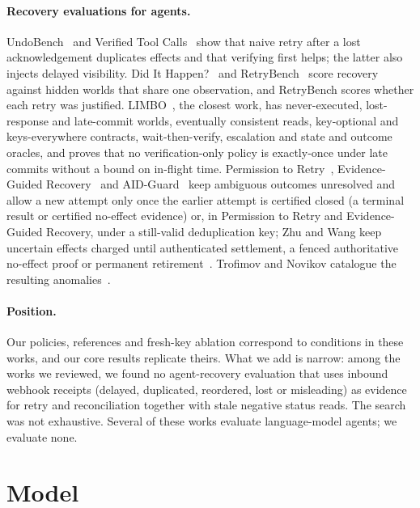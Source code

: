 \documentclass[11pt]{article}
\begin{document}
\paragraph{Recovery evaluations for agents.} UndoBench~\cite{undobench} and Verified Tool Calls~\cite{verified} show that naive retry after a lost acknowledgement duplicates effects and that verifying first helps; the latter also injects delayed visibility. Did It Happen?~\cite{didithappen} and RetryBench~\cite{retrybench} score recovery against hidden worlds that share one observation, and RetryBench scores whether each retry was justified. LIMBO~\cite{limbo}, the closest work, has never-executed, lost-response and late-commit worlds, eventually consistent reads, key-optional and keys-everywhere contracts, wait-then-verify, escalation and state and outcome oracles, and proves that no verification-only policy is exactly-once under late commits without a bound on in-flight time. Permission to Retry~\cite{permission}, Evidence-Guided Recovery~\cite{evidence} and AID-Guard~\cite{aidguard} keep ambiguous outcomes unresolved and allow a new attempt only once the earlier attempt is certified closed (a terminal result or certified no-effect evidence) or, in Permission to Retry and Evidence-Guided Recovery, under a still-valid deduplication key; Zhu and Wang keep uncertain effects charged until authenticated settlement, a fenced authoritative no-effect proof or permanent retirement~\cite{budget}. Trofimov and Novikov catalogue the resulting anomalies~\cite{trofimov}.

\paragraph{Position.} Our policies, references and fresh-key ablation correspond to conditions in these works, and our core results replicate theirs. What we add is narrow: among the works we reviewed, we found no agent-recovery evaluation that uses inbound webhook receipts (delayed, duplicated, reordered, lost or misleading) as evidence for retry and reconciliation together with stale negative status reads. The search was not exhaustive. Several of these works evaluate language-model agents; we evaluate none.

\section{Model}\label{sec:model}
\end{document}
